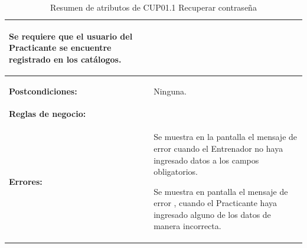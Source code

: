 \begin{table}[H]
\begin{tabular}{| l | p{12 cm} |}
							\begin{compactitem}
							\setlength\itemsep{-0.25em}
								\item Se requiere que el usuario del Practicante se encuentre registrado en los catálogos.
							\end{compactitem} \\
\hline
\textbf{Postcondiciones:} & \vspace{-2mm}	%
							\begin{compactitem}
								\item Ninguna.
							\end{compactitem}\\
							
\hline
\textbf{Reglas de negocio:} & \vspace{-2mm}	%
							\begin{compactitem}
								\item \nameref{rn:RNR12}
							\end{compactitem}\\							
\hline
\textbf{Errores:} &	\vspace{-2mm}	%
							\begin{compactitem}
								\item Se muestra en la pantalla \nameref{pant:IUE01} el mensaje de error \nameref{msj:MSG12} cuando el Entrenador no haya ingresado datos a los campos obligatorios.
								\item Se muestra en pantalla el mensaje de error \nameref{msj:MSG13}, cuando el Practicante haya ingresado alguno de los datos de manera incorrecta.
							\end{compactitem}\\
\hline	
\end{tabular}
\caption{Resumen de atributos de CUP01.1 Recuperar contraseña}
\label{tab:CUP01.1}
\end{table} 


